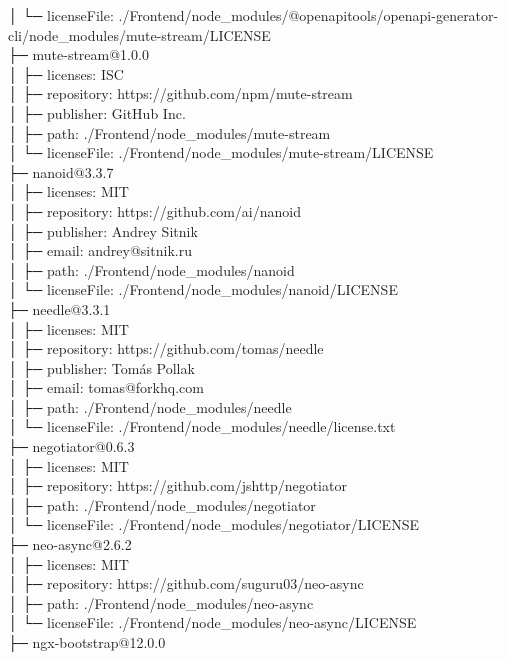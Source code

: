 │  └─ licenseFile: ./Frontend/node\_modules/@openapitools/openapi-generator-cli/node\_modules/mute-stream/LICENSE\\
├─ mute-stream@1.0.0\\
│  ├─ licenses: ISC\\
│  ├─ repository: https://github.com/npm/mute-stream\\
│  ├─ publisher: GitHub Inc.\\
│  ├─ path: ./Frontend/node\_modules/mute-stream\\
│  └─ licenseFile: ./Frontend/node\_modules/mute-stream/LICENSE\\
├─ nanoid@3.3.7\\
│  ├─ licenses: MIT\\
│  ├─ repository: https://github.com/ai/nanoid\\
│  ├─ publisher: Andrey Sitnik\\
│  ├─ email: andrey@sitnik.ru\\
│  ├─ path: ./Frontend/node\_modules/nanoid\\
│  └─ licenseFile: ./Frontend/node\_modules/nanoid/LICENSE\\
├─ needle@3.3.1\\
│  ├─ licenses: MIT\\
│  ├─ repository: https://github.com/tomas/needle\\
│  ├─ publisher: Tomás Pollak\\
│  ├─ email: tomas@forkhq.com\\
│  ├─ path: ./Frontend/node\_modules/needle\\
│  └─ licenseFile: ./Frontend/node\_modules/needle/license.txt\\
├─ negotiator@0.6.3\\
│  ├─ licenses: MIT\\
│  ├─ repository: https://github.com/jshttp/negotiator\\
│  ├─ path: ./Frontend/node\_modules/negotiator\\
│  └─ licenseFile: ./Frontend/node\_modules/negotiator/LICENSE\\
├─ neo-async@2.6.2\\
│  ├─ licenses: MIT\\
│  ├─ repository: https://github.com/suguru03/neo-async\\
│  ├─ path: ./Frontend/node\_modules/neo-async\\
│  └─ licenseFile: ./Frontend/node\_modules/neo-async/LICENSE\\
├─ ngx-bootstrap@12.0.0\\
